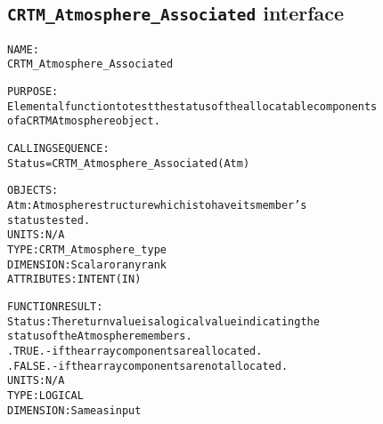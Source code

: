 \subsection{\texttt{CRTM\_Atmosphere\_Associated} interface}
  \label{sec:CRTM_Atmosphere_Associated_interface}
  \begin{alltt}
 
  NAME:
        CRTM_Atmosphere_Associated
 
  PURPOSE:
        Elemental function to test the status of the allocatable components
        of a CRTM Atmosphere object.
 
  CALLING SEQUENCE:
        Status = CRTM_Atmosphere_Associated( Atm )
 
  OBJECTS:
        Atm:       Atmosphere structure which is to have its member's
                   status tested.
                   UNITS:      N/A
                   TYPE:       CRTM_Atmosphere_type
                   DIMENSION:  Scalar or any rank
                   ATTRIBUTES: INTENT(IN)
 
  FUNCTION RESULT:
        Status:    The return value is a logical value indicating the
                   status of the Atmosphere members.
                     .TRUE.  - if the array components are allocated.
                     .FALSE. - if the array components are not allocated.
                   UNITS:      N/A
                   TYPE:       LOGICAL
                   DIMENSION:  Same as input
 
  \end{alltt}
